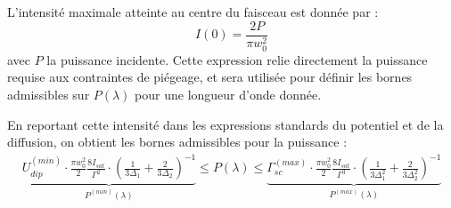 
%

L’intensité maximale atteinte au centre du faisceau est donnée par :
\[
I(0) = \frac{2P}{\pi w_0^2}
\]
avec $P$ la puissance incidente. Cette expression relie directement la puissance requise aux contraintes de piégeage, et sera utilisée pour définir les bornes admissibles sur $P(\lambda)$ pour une longueur d’onde donnée.

En reportant cette intensité dans les expressions standards du potentiel et de la diffusion, on obtient les bornes admissibles pour la puissance :
\begin{eqnarray*}
	 \underbrace{U_{dip}^{(min)} \cdot  \frac{\pi w_0^2}{2} \frac{8 I_{sat}}{\Gamma^2} \cdot \left( \frac{ 1}{ 3 \Delta_1} + \frac{2 }{ 3 \Delta_2}  \right )^{-1} }_{P^{(min)}(\lambda)}  \leq P(\lambda) \leq \underbrace{ \Gamma_{sc}^{(max)} \cdot \frac{\pi w_0^2}{2} \frac{8 I_{sat}}{\Gamma^3} \cdot \left( \frac{ 1}{ 3 \Delta_1^2} + \frac{2 }{ 3 \Delta_2^2}  \right )^{-1}}_{ P^{(max)}(\lambda)} 
\end{eqnarray*}

